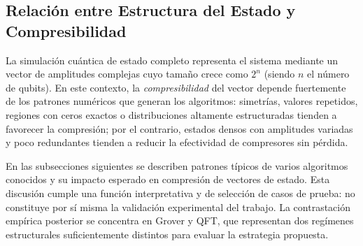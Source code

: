 \subsection{Relación entre Estructura del Estado y Compresibilidad}
\label{subsec:patrones_intro}

La simulación cuántica de estado completo representa el sistema mediante un vector de amplitudes complejas cuyo tamaño crece como $2^n$ (siendo $n$ el número de qubits). En este contexto, la \textit{compresibilidad} del vector depende fuertemente de los patrones numéricos que generan los algoritmos: simetrías, valores repetidos, regiones con ceros exactos o distribuciones altamente estructuradas tienden a favorecer la compresión; por el contrario, estados densos con amplitudes variadas y poco redundantes tienden a reducir la efectividad de compresores sin pérdida.

En las subsecciones siguientes se describen patrones típicos de varios algoritmos conocidos y su impacto esperado en compresión de vectores de estado. Esta discusión cumple una función interpretativa y de selección de casos de prueba: no constituye por sí misma la validación experimental del trabajo. La contrastación empírica posterior se concentra en Grover y QFT, que representan dos regímenes estructurales suficientemente distintos para evaluar la estrategia propuesta.
